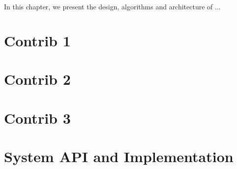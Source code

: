 
In this chapter, we present the design, algorithms and architecture of ...

\chapter{Contrib 1}
\label{ch:contrib-1}


\chapter{Contrib 2}
\label{ch:contrib-2}


\chapter{Contrib 3}
\label{ch:contrib-3}


\chapter{System API and Implementation}
\label{ch:implementation}

